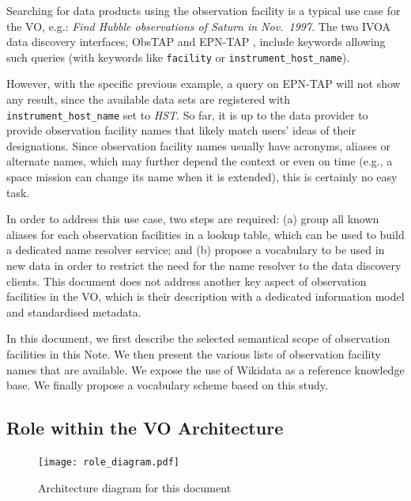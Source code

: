 \documentclass[11pt,a4paper]{ivoa}
\begin{document}
Searching for data products using the observation facility is a
typical use case for the VO, e.g.: \emph{Find Hubble observations
of Saturn in Nov.\ 1997}. The two IVOA data discovery interfaces,
ObsTAP \citep{2017ivoa.spec.0509L} and EPN-TAP \citep{ivoa:epntap},
include keywords allowing such queries (with keywords like
\texttt{facility} or \texttt{instrument\_host\_name}).

However, with
the specific previous example, a query on EPN-TAP will not show any
result, since the available data sets are registered with
\texttt{instrument\_host\_name} set to \emph{HST}. So far, it is up to the
data provider to provide observation facility names that likely match
users' ideas of their designations.  Since
observation facility names usually have acronyms, aliases or alternate
names, which may further depend the context or even on
time (e.g., a space mission can change its name when it is extended), this
is certainly no easy task.

In order to address this use case, two steps are required: (a) group
all known aliases for each observation facilities in a lookup table,
which can be used to build a dedicated name resolver service; and
(b) propose a vocabulary to be used in new data in order to restrict the
need for the name resolver to the data discovery clients.
This document does not address another key
aspect of observation facilities in the VO, which is their
description with a dedicated information model and standardised
metadata.

In this document, we first describe the selected semantical scope of
observation facilities in this Note. We then present the various
lists of observation facility names that are available. We expose the
use of Wikidata as a reference knowledge base. We finally propose a
vocabulary scheme based on this study.

\subsection{Role within the VO Architecture}

\begin{figure}
\centering


\texttt{[image: role\_diagram.pdf]}
\caption{Architecture diagram for this document}
\label{fig:archdiag}
\end{figure}
\end{document}
